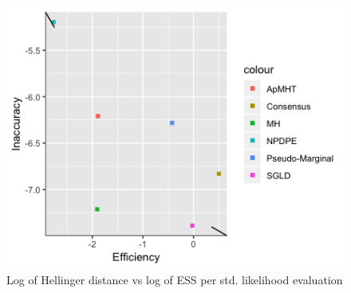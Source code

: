 \documentclass[11pt,a4paper]{report}\usepackage[]{graphicx}\usepackage[]{color}
\begin{document}
\begin{figure}
\caption{Log of Hellinger distance vs log of ESS per std. likelihood evaluation}
\label{plot:HD0}
\centering

  \includegraphics[resolution=110]{DGP0_plots/DGP0_HD_ESS.png}

\end{figure}
\end{document}
